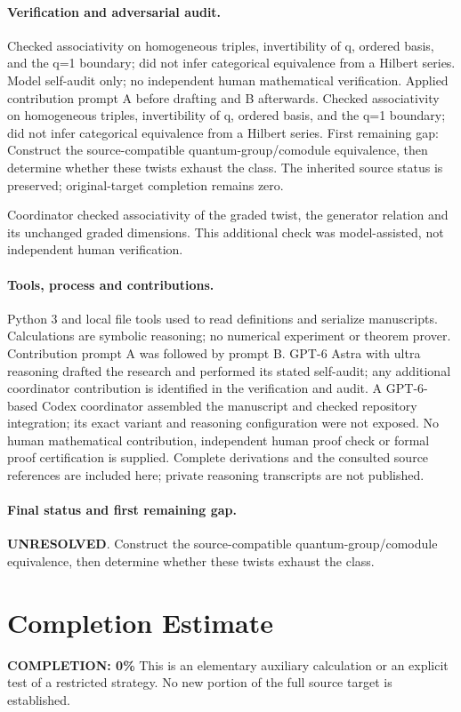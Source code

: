 \documentclass[11pt]{article}
\begin{document}
\paragraph{Verification and adversarial audit.}
Checked associativity on homogeneous triples, invertibility of q, ordered basis, and the q=1 boundary; did not infer categorical equivalence from a Hilbert series. Model self-audit only; no independent human mathematical verification. Applied contribution prompt A before drafting and B afterwards. Checked associativity on homogeneous triples, invertibility of q, ordered basis, and the q=1 boundary; did not infer categorical equivalence from a Hilbert series. First remaining gap: Construct the source-compatible quantum-group/comodule equivalence, then determine whether these twists exhaust the class. The inherited source status is preserved; original-target completion remains zero.

Coordinator checked associativity of the graded twist, the generator relation and its unchanged graded dimensions. This additional check was model-assisted, not independent human verification.

\paragraph{Tools, process and contributions.}
Python 3 and local file tools used to read definitions and serialize manuscripts. Calculations are symbolic reasoning; no numerical experiment or theorem prover. Contribution prompt A was followed by prompt B. GPT-6 Astra with ultra reasoning drafted the research and performed its stated self-audit; any additional coordinator contribution is identified in the verification and audit. A GPT-6-based Codex coordinator assembled the manuscript and checked repository integration; its exact variant and reasoning configuration were not exposed. No human mathematical contribution, independent human proof check or formal proof certification is supplied. Complete derivations and the consulted source references are included here; private reasoning transcripts are not published.

\paragraph{Final status and first remaining gap.}
\textbf{UNRESOLVED}. Construct the source-compatible quantum-group/comodule equivalence, then determine whether these twists exhaust the class.

\section{Completion Estimate}
\noindent\textbf{COMPLETION: 0\%}
This is an elementary auxiliary calculation or an explicit test of a restricted strategy. No new portion of the full source target is established.
\end{document}
